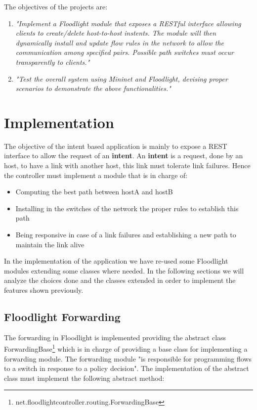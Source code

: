 \documentclass[a4paper]{report}
\begin{document}
	
	\noindent The objectives of the projects are:
	\begin{enumerate}
		\item \textit{"Implement a Floodlight module that exposes a RESTful interface allowing clients to create/delete host-to-host instents. The module will then dynamically install and update flow rules in the network to allow the communication among specified pairs. Possible path switches must occur transparently to clients."}
		
		\item \textit{"Test the overall system using Mininet and Floodlight, devising proper scenarios to demonstrate the above functionalities."}
	\end{enumerate}
	
	
	\chapter{Implementation}
	\noindent The objective of the intent based application is mainly to expose a REST interface to allow the request of an \textbf{intent}. An \textbf{intent} is a request, done by an host, to have a link with another host, this link must tolerate link failures.
	\noindent Hence the controller must implement a module that is in charge of:
	\begin{itemize}
		\item Computing the best path between hostA and hostB
		\item Installing in the switches of the network the proper rules to establish this path
		\item Being responsive in case of a link failures and establishing a new path to maintain the link alive
	\end{itemize}
	\noindent In the implementation of the application we have re-used some Floodlight modules extending some classes where needed. In the following sections we will analyze the choices done and the classes extended in order to implement the features shown previously.
	
	\section{Floodlight Forwarding}
	\noindent The forwarding in Floodlight is implemented providing the abstract class ForwardingBase\footnote{net.floodlightcontroller.routing.ForwardingBase} which is in charge of providing a base class for implementing a forwarding module. The forwarding module "is responsible for programming flows to a switch in response to a policy decision". The implementation of the abstract class must implement the following abstract method:
	
\end{document}

